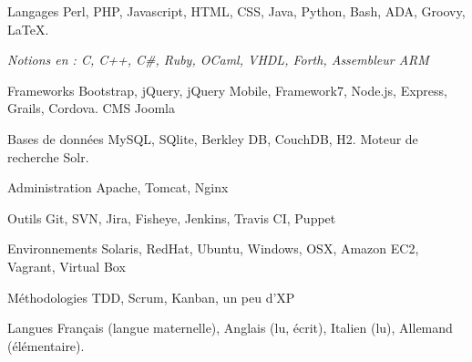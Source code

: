 
\begin{cvskills}

  \cvskill
    {Langages}
    {Perl, PHP, Javascript, HTML, CSS, Java, Python, Bash, ADA, Groovy, LaTeX.
    }

  \cvskill
    {}
    {\textit{Notions en : C, C++, C\#, Ruby, OCaml, VHDL, Forth, Assembleur ARM}}

  \cvskill
    {Frameworks}
    {Bootstrap, jQuery, jQuery Mobile, Framework7, Node.js, Express, Grails, Cordova. CMS Joomla}

  \cvskill
    {Bases de données}
    {MySQL, SQlite, Berkley DB, CouchDB, H2. Moteur de recherche Solr.}

  \cvskill
    {Administration}
    {Apache, Tomcat, Nginx}

  \cvskill
    {Outils}
    {Git, SVN, Jira, Fisheye, Jenkins, Travis CI, Puppet}

  \cvskill
    {Environnements}
    {Solaris, RedHat, Ubuntu, Windows, OSX, Amazon EC2, Vagrant, Virtual Box}

  \cvskill
    {Méthodologies}
    {TDD, Scrum, Kanban, un peu d'XP}

  \cvskill
    {Langues}
    {Français (langue maternelle), Anglais (lu, écrit), Italien (lu), Allemand (élémentaire).}

\end{cvskills}
